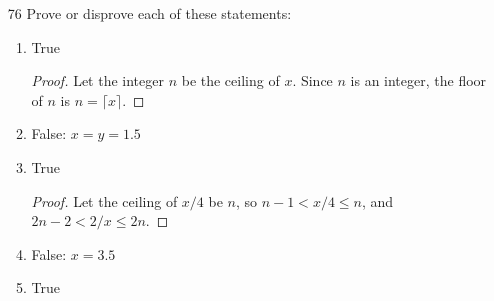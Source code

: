 \documentclass{article}
\begin{document}
\begin{enumerate}
\begin{enumerate}
\begin{proof}
            Similarly, let $x \in f(S \cup T)$. So there exists some $y \in A$
            such that $f(y) = x$, so $y$ is in $S \cup T$. This means that either
            $y \in S$ or $y \in T$, so $f(y) \in f(S)$ or $f(y) in f(T)$. 
            Thus, $f(S \cup T) \subset f(S) \cup f(T)$.

            Since both are subsets of the other, $f(S \cup T) = f(S) \cup f(T)$.
          \end{proof}
        \item $F(S \cap T) \subset f(S) \cap f(T)$
          \begin{proof}
            Let $x \in f(S \cap T)$. Then $\exists y \in A$ such that
            $f(y)=x$. So $y \in S \cap T$, meaning that $y \in S$ and
            $y \in T$. Then $f(y) \in f(S) \land f(y) \in f(T)$, making
            $F(S \cap T) \subset f(S) \cap f(T)$.
          \end{proof}
      \end{enumerate}
    \item[76] Prove or disprove each of these statements:
      \begin{enumerate}
        \item True
          \begin{proof}
            Let the integer $n$ be the ceiling of $x$. Since $n$ is an integer,
            the floor of $n$ is $n = \lceil x \rceil$.
          \end{proof}
        \item False: $x=y=1.5$
        \item True
          \begin{proof}
            Let the ceiling of $x/4$ be $n$, so $n-1 < x/4 \leq n$, and
            $2n-2 < 2/x \leq 2n$. 
          \end{proof}
        \item False: $x=3.5$
        \item True
      \end{enumerate}
\end{enumerate}
\end{document}
